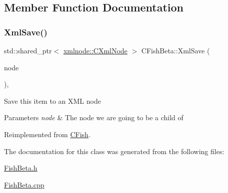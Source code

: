 \subsection{Member Function Documentation}
\mbox{\label{class_c_fish_beta_a0be2886a531ede77bfa5338fec71d71b}} 
\subsubsection{\texorpdfstring{Xml\+Save()}{XmlSave()}}
{\footnotesize\ttfamily std\+::shared\+\_\+ptr$<$ \mbox{\hyperlink{classxmlnode_1_1_c_xml_node}{xmlnode\+::\+C\+Xml\+Node}} $>$ C\+Fish\+Beta\+::\+Xml\+Save (\begin{DoxyParamCaption}\item[{const std\+::shared\+\_\+ptr$<$ \mbox{\hyperlink{classxmlnode_1_1_c_xml_node}{xmlnode\+::\+C\+Xml\+Node}} $>$ \&}]{node }\end{DoxyParamCaption})\hspace{0.3cm}{\ttfamily [override]}, {\ttfamily [virtual]}}

Save this item to an X\+ML node 
\begin{DoxyParams}{Parameters}
{\em node} & The node we are going to be a child of \\
\hline
\end{DoxyParams}


Reimplemented from \mbox{\hyperlink{class_c_fish_abfc997d2d755be8f94069c57e75a854b}{C\+Fish}}.



The documentation for this class was generated from the following files\+:\begin{DoxyCompactItemize}
\item 
\mbox{\hyperlink{_fish_beta_8h}{Fish\+Beta.\+h}}\item 
\mbox{\hyperlink{_fish_beta_8cpp}{Fish\+Beta.\+cpp}}\end{DoxyCompactItemize}
